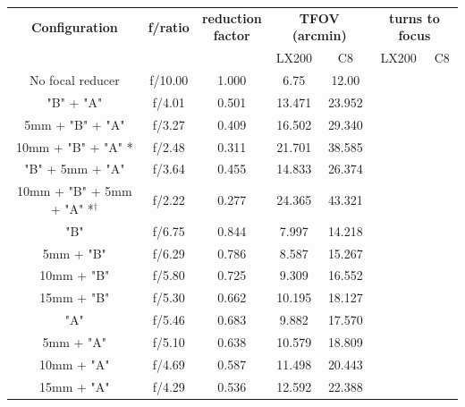 \documentclass[12pt,titlepage]{article}
\begin{document}
\begin{appendix}
\begin{center}  
\small{
\begin{tabular}{|c|c|c|c|c|c|c|}
	\hline
	\textbf{Configuration} & \textbf{f/ratio} & \thead{\bf reduction\\ \bf factor} & \multicolumn{2}{c|}{\textbf{TFOV (arcmin)}} & \multicolumn{2}{c|}{\textbf{turns to focus}}  \\
										&			&			&	LX200	&	C8		&	LX200	& 	C8 \\ [-1ex]
	\hline
	No focal reducer		 				&	f/10.00	&	1.000	& 	6.75		&	12.00	&			&		\\ [-1ex]								
	\hline
	"B" + "A" 		 					&	f/4.01	&	0.501	& 	13.471	&	23.952	&			&		\\ [-1ex]
	\hline
	5mm + "B" + "A" 	  					&	f/3.27	&	0.409	& 	16.502	&	29.340	&			&		\\ [-1ex]
	\hline
	10mm + "B" + "A" *  					&	f/2.48	&	0.311	& 	21.701	&	38.585	&			&		\\ [-1ex]
	\hline
	"B" + 5mm + "A"   					&	f/3.64	&	0.455	& 	14.833	&	26.374	&			&		\\ [-1ex]
	\hline
	10mm + "B" + 5mm + "A" *$^{\dagger}$ &	f/2.22	&	0.277	& 	24.365	&	43.321	&			&		\\ [-1ex]
	\hline
	"B" 									&	f/6.75	&	0.844	& 	7.997	&	14.218	&			&		\\ [-1ex]
	\hline
	5mm + "B"							&	f/6.29	&	0.786	& 	8.587	&	15.267	&			&		\\ [-1ex]
	\hline
	10mm + "B"							&	f/5.80	&	0.725	& 	9.309	&	16.552	&			&		\\ [-1ex]
	\hline
	15mm + "B"							&	f/5.30 	&	0.662	& 	10.195	&	18.127	&			&		\\ [-1ex]
	\hline
	"A" 									&	f/5.46	&	0.683	& 	9.882	&	17.570	&			&		\\ [-1ex]
	\hline
	5mm + "A" 							&	f/5.10 	&	0.638	& 	10.579	&	18.809	&			&		\\ [-1ex]
	\hline
	10mm + "A"							&	f/4.69 	&	0.587	& 	11.498	&	20.443	&			&		\\ [-1ex]
	\hline
	15mm + "A"							&	f/4.29	&	0.536	& 	12.592	&	22.388	&			&		\\ 
	\hline
\end{tabular}}\\
				\label{tab:focal_reduction} 
\vspace{.4 cm}
\end{center}




\end{appendix}
\end{document}
